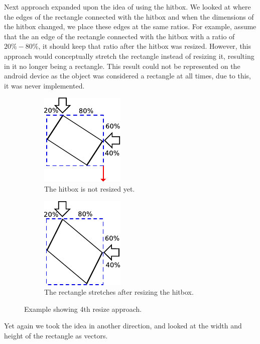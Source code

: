 Next approach expanded upon the idea of using the hitbox. 
We looked at where the edges of the rectangle connected with the hitbox and when the dimensions of the hitbox changed, we place these edges at the same ratios.
For example, assume that the an edge of the rectangle connected with the hitbox with a ratio of $20\% - 80\%$, it should keep that ratio after the hitbox was resized.
However, this approach would conceptually stretch the rectangle instead of resizing it, resulting in it no longer being a rectangle.
This result could not be represented on the android device as the object was considered a rectangle at all times, due to this, it was never implemented.
\begin{figure}[h]
	\centering
	\begin{subfigure}[b]{0.45\textwidth}
		\centering
		\includegraphics[scale=0.5]{media/sprint3/scaling-no-stretching}
		\caption{The hitbox is not resized yet.}
		\label{figure:app4.1}
	\end{subfigure}
	\qquad
	\begin{subfigure}[b]{0.45\textwidth}
		\centering
				\includegraphics[scale=0.5]{media/sprint3/scaling-with-stretching}
				\caption{The rectangle stretches after resizing the hitbox.}
		\label{figure:app4.2}
	\end{subfigure}
	\caption{Example showing 4th resize approach.}
	\label{figure:app4}
\end{figure}
Yet again we took the idea in another direction, and looked at the width and height of the rectangle as vectors.
